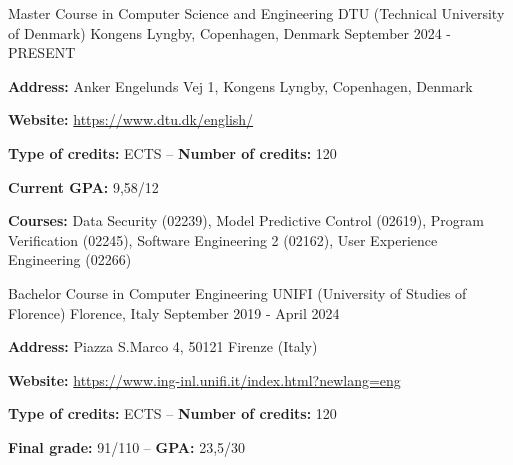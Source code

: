

\begin{cventries}

  \cventry
    {Master Course in Computer Science and Engineering} %
    {DTU (Technical University of Denmark)} %
    {Kongens Lyngby, Copenhagen, Denmark} %
    {September 2024 - PRESENT} %
    {
      \begin{cvitems} %
        \item {\textbf{Address:} Anker Engelunds Vej 1, Kongens Lyngby, Copenhagen, Denmark}
        \item {\textbf{Website:} \href{https://www.dtu.dk/english/}{https://www.dtu.dk/english/}}
        \item {\textbf{Type of credits:} ECTS – \textbf{Number of credits:} 120}
        \item {\textbf{Current GPA:} 9,58/12}
        \item {\textbf{Courses:} Data Security (02239), Model Predictive Control (02619), Program Verification (02245), Software Engineering 2 (02162), User Experience Engineering (02266)}
      \end{cvitems}
    }

  \cventry
    {Bachelor Course in Computer Engineering} %
    {UNIFI (University of Studies of Florence)} %
    {Florence, Italy} %
    {September 2019 - April 2024} %
    {
      \begin{cvitems} %
        \item {\textbf{Address:} Piazza S.Marco 4, 50121 Firenze (Italy)}
        \item {\textbf{Website:} \href{https://www.ing-inl.unifi.it/index.html?newlang=eng}{https://www.ing-inl.unifi.it/index.html?newlang=eng}}
        \item {\textbf{Type of credits:} ECTS – \textbf{Number of credits:} 120}
        \item {\textbf{Final grade:} 91/110 – \textbf{GPA:} 23,5/30}
      \end{cvitems}
    }


\end{cventries}
